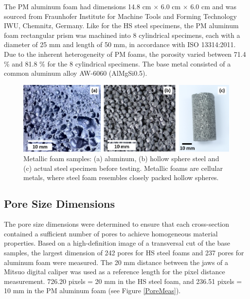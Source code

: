 \documentclass[review]{elsarticle}
\begin{document}
The PM aluminum foam had dimensions 14.8 cm $\times$ 6.0 cm $\times$ 6.0 cm and was sourced from Fraunhofer Institute for Machine Tools and Forming Technology IWU, Chemnitz, Germany. Like for the HS steel specimens, the PM aluminum foam rectangular prism was machined into 8 cylindrical specimens, each with a diameter of 25 mm and length of 50 mm, in accordance with ISO 13314:2011. Due to the inherent heterogeneity of PM foams, the porosity varied between 71.4 \% and 81.8 \% for the 8 cylindrical specimens. The base metal consisted of a common aluminum alloy AW-6060 (AlMgSi0.5).

\begin{figure}[htbp]
	\begin{center}
		\includegraphics[width=0.95\linewidth]{Tex-Figures/Fig01a_b_c.png}
		\caption{Metallic foam samples: (a) aluminum, (b) hollow sphere steel and (c) actual steel specimen before testing. Metallic foams are cellular metals, where steel foam resembles closely packed hollow spheres.}
		\label{Samples}
	\end{center}
\end{figure}

\subsection*{Pore Size Dimensions}

The pore size dimensions were determined to ensure that each cross-section contained a sufficient number of pores to achieve homogeneous material properties. Based on a high-definition image of a transversal cut of the base samples, the largest dimension of 242 pores for HS steel foams and 237 pores for aluminum foam were measured. The 20 mm distance between the jaws of a Mitsuo digital caliper was used as a reference length for the pixel distance measurement. 726.20 pixels = 20 mm in the HS steel foam, and 236.51 pixels = 10 mm in the PM aluminum foam (see Figure \ref{PoreMeas}).
\end{document}
